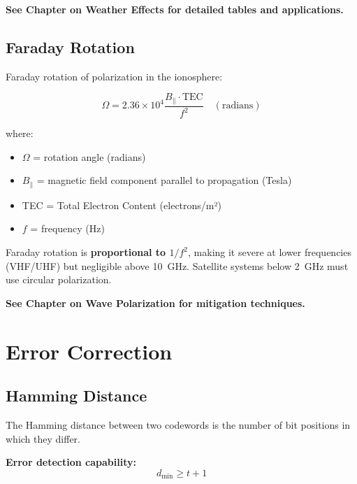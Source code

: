 \textbf{See Chapter on Weather Effects for detailed tables and applications.}

\subsection{Faraday Rotation}
\label{subsec:faraday-rotation}

Faraday rotation of polarization in the ionosphere:

\begin{equation}
\label{eq:faraday-rotation}
\Omega = 2.36 \times 10^4 \frac{B_\parallel \cdot \text{TEC}}{f^2} \quad (\text{radians})
\end{equation}

where:
\begin{itemize}
\item $\Omega$ = rotation angle (radians)
\item $B_\parallel$ = magnetic field component parallel to propagation (Tesla)
\item TEC = Total Electron Content (electrons/m²)
\item $f$ = frequency (Hz)
\end{itemize}

\begin{importantbox}
Faraday rotation is \textbf{proportional to $1/f^2$}, making it severe at lower frequencies (VHF/UHF) but negligible above 10~GHz. Satellite systems below 2~GHz must use circular polarization.
\end{importantbox}

\textbf{See Chapter on Wave Polarization for mitigation techniques.}

\section{Error Correction}
\label{sec:error-correction}

\subsection{Hamming Distance}
\label{subsec:hamming-distance}

The Hamming distance between two codewords is the number of bit positions in which they differ.

\textbf{Error detection capability:}
\begin{equation}
\label{eq:hamming-detection}
d_{\min} \geq t + 1
\end{equation}

